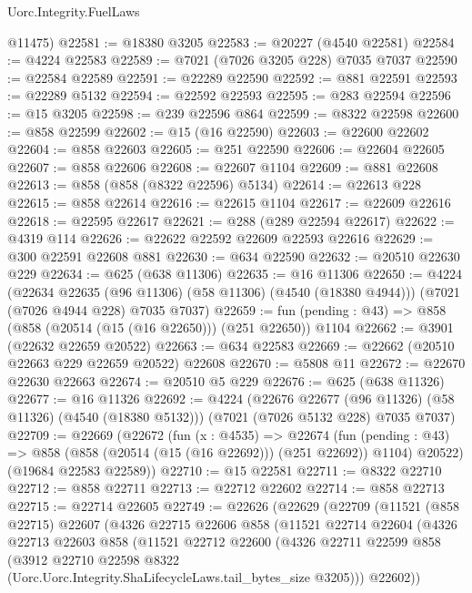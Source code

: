 \begin{lexlean}{Uorc.Integrity.FuelLaws}
\begin{coremodule}
      @11475)
@22581 := @18380 @3205
@22583 := @20227 (@4540 @22581)
@22584 := @4224 @22583
@22589 := @7021 (@7026 @3205 @228) @7035 @7037
@22590 := @22584 @22589
@22591 := @22289 @22590
@22592 := @881 @22591
@22593 := @22289 @5132
@22594 := @22592 @22593
@22595 := @283 @22594
@22596 := @15 @3205
@22598 := @239 @22596 @864
@22599 := @8322 @22598
@22600 := @858 @22599
@22602 := @15 (@16 @22590)
@22603 := @22600 @22602
@22604 := @858 @22603
@22605 := @251 @22590
@22606 := @22604 @22605
@22607 := @858 @22606
@22608 := @22607 @1104
@22609 := @881 @22608
@22613 := @858 (@858 (@8322 @22596) @5134)
@22614 := @22613 @228
@22615 := @858 @22614
@22616 := @22615 @1104
@22617 := @22609 @22616
@22618 := @22595 @22617
@22621 := @288 (@289 @22594 @22617)
@22622 := @4319 @114
@22626 := @22622 @22592 @22609 @22593 @22616
@22629 := @300 @22591 @22608 @881
@22630 := @634 @22590
@22632 := @20510 @22630 @229
@22634 := @625 (@638 @11306)
@22635 := @16 @11306
@22650 := @4224
    (@22634 @22635 (@96 @11306) (@58 @11306) (@4540 (@18380 @4944)))
    (@7021 (@7026 @4944 @228) @7035 @7037)
@22659 := fun (pending : @43) => @858 (@858 (@20514 (@15 (@16 @22650))) (@251 @22650)) @1104
@22662 := @3901 (@22632 @22659 @20522)
@22663 := @634 @22583
@22669 := @22662 (@20510 @22663 @229 @22659 @20522) @22608
@22670 := @5808 @11
@22672 := @22670 @22630 @22663
@22674 := @20510 @5 @229
@22676 := @625 (@638 @11326)
@22677 := @16 @11326
@22692 := @4224
    (@22676 @22677 (@96 @11326) (@58 @11326) (@4540 (@18380 @5132)))
    (@7021 (@7026 @5132 @228) @7035 @7037)
@22709 := @22669
    (@22672
      (fun (x : @4535) =>
      @22674
        (fun (pending : @43) => @858 (@858 (@20514 (@15 (@16 @22692))) (@251 @22692)) @1104)
        @20522)
      (@19684 @22583 @22589))
@22710 := @15 @22581
@22711 := @8322 @22710
@22712 := @858 @22711
@22713 := @22712 @22602
@22714 := @858 @22713
@22715 := @22714 @22605
@22749 := @22626
    (@22629
      (@22709
        (@11521
          (@858 @22715)
          @22607
          (@4326
            @22715
            @22606
            @858
            (@11521
              @22714
              @22604
              (@4326
                @22713
                @22603
                @858
                (@11521
                  @22712
                  @22600
                  (@4326
                    @22711
                    @22599
                    @858
                    (@3912
                      @22710
                      @22598
                      @8322
                      (Uorc.Uorc.Integrity.ShaLifecycleLaws.tail_bytes_size @3205)))
                  @22602))

\end{coremodule}
\end{lexlean}
